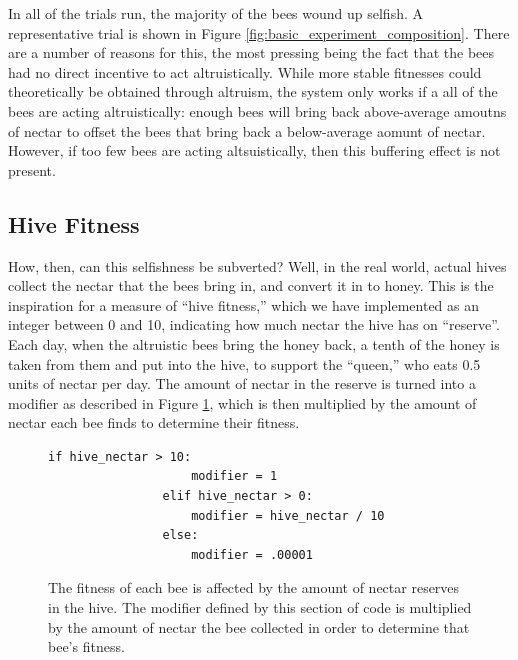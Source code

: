 \documentclass[11pt]{article}
\begin{document}
			In all of the trials run, the majority of the bees wound up selfish. A representative trial is shown in Figure \ref{fig:basic_experiment_composition}. There are a number of reasons for this, the most pressing being the fact that the bees had no direct incentive to act altruistically. While more stable fitnesses could theoretically be obtained through altruism, the system only works if a all of the bees are acting altruistically: enough bees will bring back above-average amoutns of nectar to offset the bees that bring back a below-average aomunt of nectar. However, if too few bees are acting altsuistically, then this buffering effect is not present. 



		\subsection{Hive Fitness} %
		\label{sub:hive_fitness}
			How, then, can this selfishness be subverted? Well, in the real world, actual hives collect the nectar that the bees bring in, and convert it in to honey. This is the inspiration for a measure of ``hive fitness,'' which we have implemented as an integer between 0 and 10, indicating how much nectar the hive has on ``reserve''. Each day, when the altruistic bees bring the honey back, a tenth of the honey is taken from them and put into the hive, to support the ``queen,'' who eats 0.5 units of nectar per day. The amount of nectar in the reserve is turned into a modifier as described in Figure \ref{fig:modifier_algorithm}, which is then multiplied by the amount of nectar each bee finds to determine their fitness.

			\begin{figure}[tb]
				\begin{Verbatim}[frame=single]
                if hive_nectar > 10:
                    modifier = 1
                elif hive_nectar > 0:
                    modifier = hive_nectar / 10
                else:
                    modifier = .00001 
				\end{Verbatim}
				\caption{The fitness of each bee is affected by the amount of nectar reserves in the hive. The modifier defined by this section of code is multiplied by the amount of nectar the bee collected in order to determine that bee's fitness.}
				\label{fig:modifier_algorithm}
			\end{figure}
\end{document}

